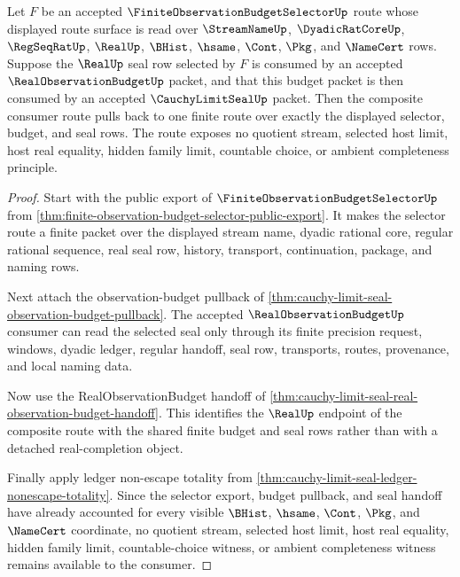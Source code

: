\begin{theorem}
\label{thm:cauchy-limit-seal-finite-budget-selector-pullback}
Let $F$ be an accepted $\FiniteObservationBudgetSelectorUp$ route whose displayed route surface is read over $\StreamNameUp$, $\DyadicRatCoreUp$, $\RegSeqRatUp$, $\RealUp$, $\BHist$, $\hsame$, $\Cont$, $\Pkg$, and $\NameCert$ rows. Suppose the $\RealUp$ seal row selected by $F$ is consumed by an accepted $\RealObservationBudgetUp$ packet, and that this budget packet is then consumed by an accepted $\CauchyLimitSealUp$ packet. Then the composite consumer route pulls back to one finite route over exactly the displayed selector, budget, and seal rows. The route exposes no quotient stream, selected host limit, host real equality, hidden family limit, countable choice, or ambient completeness principle.
\end{theorem}
\begin{proof}
Start with the public export of $\FiniteObservationBudgetSelectorUp$ from \autoref{thm:finite-observation-budget-selector-public-export}. It makes the selector route a finite packet over the displayed stream name, dyadic rational core, regular rational sequence, real seal row, history, transport, continuation, package, and naming rows.

Next attach the observation-budget pullback of \autoref{thm:cauchy-limit-seal-observation-budget-pullback}. The accepted $\RealObservationBudgetUp$ consumer can read the selected seal only through its finite precision request, windows, dyadic ledger, regular handoff, seal row, transports, routes, provenance, and local naming data.

Now use the RealObservationBudget handoff of \autoref{thm:cauchy-limit-seal-real-observation-budget-handoff}. This identifies the $\RealUp$ endpoint of the composite route with the shared finite budget and seal rows rather than with a detached real-completion object.

Finally apply ledger non-escape totality from \autoref{thm:cauchy-limit-seal-ledger-nonescape-totality}. Since the selector export, budget pullback, and seal handoff have already accounted for every visible $\BHist$, $\hsame$, $\Cont$, $\Pkg$, and $\NameCert$ coordinate, no quotient stream, selected host limit, host real equality, hidden family limit, countable-choice witness, or ambient completeness witness remains available to the consumer.
\end{proof}

